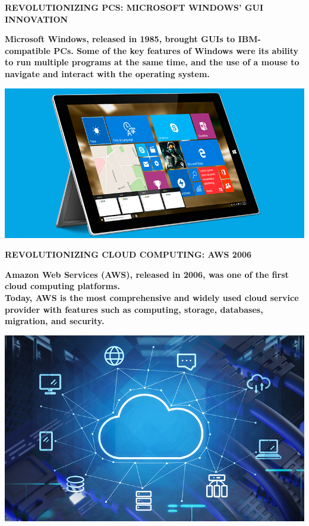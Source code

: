 \documentclass[pdf,aspectratio=169]{beamer}
\begin{document}
\begin{frame}{\textbf{REVOLUTIONIZING PCS: MICROSOFT WINDOWS' GUI INNOVATION}}
	\begin{minipage}{0.6\textwidth}
		\textbf{\text Microsoft Windows, released in 1985, brought GUIs to IBM-compatible PCs. Some of the key features of Windows were its ability to run multiple programs at the same time, and the use of a mouse to navigate and interact with the operating system.} 
	\end{minipage}
	\hfill
	\begin{minipage}{0.3\textwidth}
		\centering
		\includegraphics[width=\textwidth]{figs/IMG4}
	\end{minipage}
\end{frame}

\begin{frame}{\textbf{REVOLUTIONIZING CLOUD COMPUTING: AWS 2006}}
	\begin{minipage}{0.6\textwidth}
		\textbf{\text Amazon Web Services (AWS), released in 2006, was one of the first cloud computing platforms.}
		\\
		\textbf{\text Today, AWS is the most comprehensive and widely used cloud service provider with features such as computing, storage, databases, migration, and security.}
	\end{minipage}
	\hfill
	\begin{minipage}{0.3\textwidth}
		\centering
		\includegraphics[width=\textwidth]{figs/IMG5}
	\end{minipage}
\end{frame}
\end{document}
